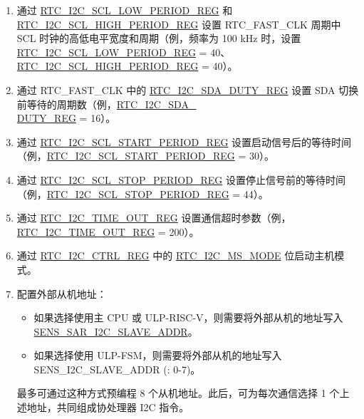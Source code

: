 \documentclass[main\_\_CN.tex]{subfiles}
\begin{document}
\begin{enumerate}
    \item 通过 \hyperref[fielddesc:RTCI2CSCLLOWPERIODREG]{RTC\_I2C\_SCL\_LOW\_PERIOD\_REG} 和 \hyperref[fielddesc:RTCI2CSCLHIGHPERIODREG]{RTC\_I2C\_SCL\_HIGH\_PERIOD\_REG} 设置 RTC\_FAST\_CLK 周期中 SCL 时钟的高低电平宽度和周期（例，频率为 100 kHz 时，设置 \hyperref[fielddesc:RTCI2CSCLLOWPERIODREG]{RTC\_I2C\_SCL\_LOW\_PERIOD\_REG} = 40、 \hyperref[fielddesc:RTCI2CSCLHIGHPERIODREG]{RTC\_I2C\_SCL\_HIGH\_PERIOD\_REG} = 40）。

    \item 通过 RTC\_FAST\_CLK 中的 \hyperref[regdesc:RTCI2CSDADUTYREG]{RTC\_I2C\_SDA\_DUTY\_REG} 设置 SDA 切换前等待的周期数（例，\hyperref[regdesc:RTCI2CSDADUTYREG]{RTC\_I2C\_SDA\_\\DUTY\_REG} = 16）。

    \item 通过 \hyperref[regdesc:RTCI2CSCLSTARTPERIODREG]{RTC\_I2C\_SCL\_START\_PERIOD\_REG} 设置启动信号后的等待时间（例，\hyperref[regdesc:RTCI2CSCLSTARTPERIODREG]{RTC\_I2C\_SCL\_START\_PERIOD\_REG} = 30）。

    \item 通过 \hyperref[regdesc:RTCI2CSCLSTOPPERIODREG]{RTC\_I2C\_SCL\_STOP\_PERIOD\_REG} 设置停止信号前的等待时间（例，\hyperref[regdesc:RTCI2CSCLSTOPPERIODREG]{RTC\_I2C\_SCL\_STOP\_PERIOD\_REG} = 44）。

    \item 通过 \hyperref[fielddesc:RTCI2CTIMEOUTREG]{RTC\_I2C\_TIME\_OUT\_REG} 设置通信超时参数（例，\hyperref[fielddesc:RTCI2CTIMEOUTREG]{RTC\_I2C\_TIME\_OUT\_REG} = 200）。

    \item 通过 \hyperref[regdesc:RTCI2CCTRLREG]{RTC\_I2C\_CTRL\_REG} 中的 \hyperref[fielddesc:RTCI2CMSMODE]{RTC\_I2C\_MS\_MODE} 位启动主机模式。

    \item 配置外部从机地址：
    \begin{itemize}
        \item 如果选择使用主 CPU 或 ULP-RISC-V，则需要将外部从机的地址写入 \hyperref[fielddesc:SENSSARI2CSLAVEADDR]{SENS\_SAR\_I2C\_SLAVE\_ADDR}。
        \item 如果选择使用 ULP-FSM，则需要将外部从机的地址写入 SENS\_I2C\_SLAVE\_ADDR (: 0-7)。
    \end{itemize}
    最多可通过这种方式预编程 8 个从机地址。此后，可为每次通信选择 1 个上述地址，共同组成协处理器 I2C 指令。
\end{enumerate}
\end{document}
